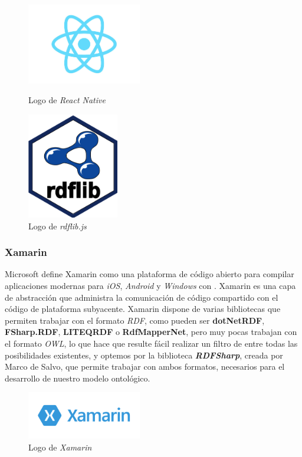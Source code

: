 \begin{figure}[H]
    \centering
    \begin{minipage}{5cm}
        \centering
        \includegraphics[width=5cm]{Images/Logo_React.jpeg}
        \caption{Logo de \textit{React Native}}  
    \end{minipage}
    \hfill
    \begin{minipage}{5cm}
        \centering
        \includegraphics[width=4cm]{Images/Logo_Rdflib.jpeg}
        \caption{Logo de \textit{rdflib.js}}  
    \end{minipage}
\end{figure}

\subsubsection{Xamarin}
Microsoft define Xamarin como una plataforma de código abierto para compilar aplicaciones modernas para \textit{iOS}, 
\textit{Android} y \textit{Windows} con \textit{\dotnet} \autocite*{Xamarin}. Xamarin es una capa de abstracción que administra la comunicación 
de código compartido con el código de plataforma subyacente. Xamarin dispone de varias bibliotecas que permiten trabajar con 
el formato \textit{RDF}, como pueden ser \textbf{dotNetRDF}, \textbf{FSharp.RDF}, \textbf{LITEQRDF} o \textbf{RdfMapperNet}, 
pero muy pocas trabajan con el formato \textit{OWL}, lo que hace que resulte fácil realizar un filtro de entre todas las 
posibilidades existentes, y optemos por la biblioteca \textit{\textbf{RDFSharp}}, creada por Marco de Salvo, que permite 
trabajar con ambos formatos, necesarios para el desarrollo de nuestro modelo ontológico.

\begin{figure}[H]
    \centering
    \includegraphics[width=5cm]{Images/Logo_Xamarin.png}
    \caption{Logo de \textit{Xamarin}}
\end{figure}
